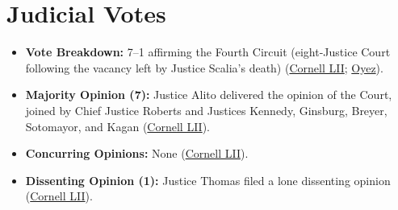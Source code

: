 \documentclass[12pt]{article}
\begin{document}
\section{Judicial Votes}
\begin{itemize}
\item \textbf{Vote Breakdown:} 7--1 affirming the Fourth Circuit (eight-Justice Court following the vacancy left by Justice Scalia's death) (\href{https://www.law.cornell.edu/supremecourt/text/14-6166}{Cornell LII}; \href{https://www.oyez.org/cases/2015/14-6166}{Oyez}).
\item \textbf{Majority Opinion (7):} Justice Alito delivered the opinion of the Court, joined by Chief Justice Roberts and Justices Kennedy, Ginsburg, Breyer, Sotomayor, and Kagan (\href{https://www.law.cornell.edu/supremecourt/text/14-6166}{Cornell LII}).
\item \textbf{Concurring Opinions:} None (\href{https://www.law.cornell.edu/supremecourt/text/14-6166}{Cornell LII}).
\item \textbf{Dissenting Opinion (1):} Justice Thomas filed a lone dissenting opinion (\href{https://www.law.cornell.edu/supremecourt/text/14-6166}{Cornell LII}).
\end{itemize}
\end{document}
